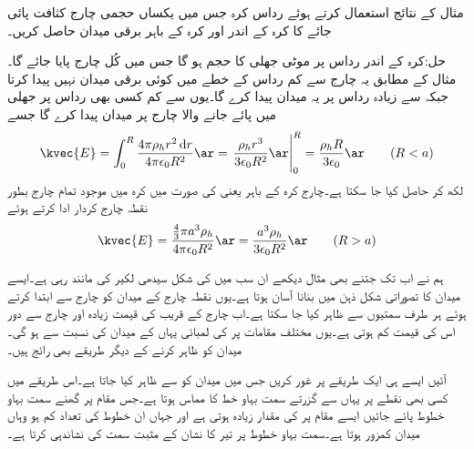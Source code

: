 مثال  کے نتائج استعمال کرتے ہوئے   رداس کرہ جس میں یکساں  حجمی چارج کثافت پائی جائے کا کرہ کے اندر اور کرہ کے باہر برقی میدان  حاصل کریں۔

حل:کرہ کے اندر رداس  پر  موٹی جھلی کا حجم  ہو گا جس میں کُل  چارج پایا جائے گا۔مثال   کے مطابق یہ چارج  سے کم رداس کے خطے میں کوئی برقی میدان نہیں پیدا کرتا جبکہ  سے زیادہ رداس پر یہ میدان پیدا کرے گا۔یوں  سے کم کسی بھی رداس پر جھلی میں پائے جانے والا چارج  پر میدان پیدا کرے گا جسے
\begin{align}
\kvec{E}=\int_0^{R} \frac{4\pi \rho_h r^2 \dif r}{4\pi \epsilon_0 R^2} \ar=\left. \frac{\rho_h r^3}{3\epsilon_0 R^2} \ar\right|_0^R=\frac{\rho_h R}{3\epsilon_0}\ar \quad \quad (R<a)
\end{align}
لکھ کر حاصل کیا جا سکتا ہے۔چارج کرہ کے باہر یعنی  کی صورت میں کرہ میں موجود تمام چارج بطور نقطہ چارج کردار ادا کرتے ہوئے
\begin{align}
\kvec{E}=\frac{\frac{4}{3} \pi a^3 \rho_h}{4\pi \epsilon_0 R^2}\ar=\frac{ a^3 \rho_h}{3\epsilon_0 R^2}\ar  \quad \quad (R>a)
\end{align}

ہم نے اب تک جتنے بھی مثال دیکھے ان سب میں  کی شکل سیدھی لکیر کی مانند رہی ہے۔ایسے میدان کا تصوراتی شکل ذہن میں بنانا آسان ہوتا ہے۔یوں نقطہ چارج کے میدان کو چارج سے ابتدا کرتے ہوئے ہر طرف سمتیوں سے ظاہر کیا جا سکتا ہے۔اب چارج کے قریب  کی قیمت زیادہ اور چارج سے دور اس کی قیمت کم ہوتی ہے۔یوں مختلف مقامات پر  کی لمبائی یہاں کے میدان کی نسبت سے ہو گی۔میدان کو ظاہر کرنے کے دیگر طریقے بھی رائج ہیں۔

آئیں ایسے ہی ایک طریقے پر غور کریں جس میں میدان کو  سے ظاہر کیا جاتا ہے۔اس طریقے میں کسی بھی نقطے  پر  یہاں سے گزرتے سمت بہاو خط کا مماس ہوتا ہے۔جس مقام پر گھنے سمت بہاو خطوط  پائے جائیں ایسے مقام پر  کی مقدار زیادہ ہوتی ہے اور جہاں ان خطوط کی تعداد کم ہو وہاں میدان کمزور ہوتا ہے۔سمت بہاو خطوط پر تیر کا نشان  کے مثبت سمت کی نشاندہی کرتا ہے۔
 
